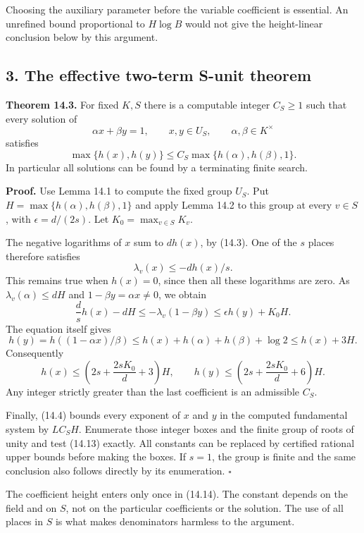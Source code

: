 \documentclass[
  11pt,
  a4paper,
]{article}
\begin{document}
Choosing the auxiliary parameter before the variable coefficient is
essential. An unrefined bound proportional to \(H\log B\) would not give
the height-linear conclusion below by this argument.

\subsection{3. The effective two-term S-unit
theorem}\label{the-effective-two-term-s-unit-theorem}

\textbf{Theorem 14.3.} For fixed \(K,S\) there is a computable integer
\(C_S\ge1\) such that every solution of \[
\alpha x+\beta y=1,\qquad x,y\in U_S,\qquad
\alpha,\beta\in K^\times
\tag{14.13}
\] satisfies \[
\max\{h(x),h(y)\}\le
C_S\max\{h(\alpha),h(\beta),1\}.
\tag{14.14}
\] In particular all solutions can be found by a terminating finite
search.

\textbf{Proof.} Use Lemma 14.1 to compute the fixed group \(U_S\). Put
\(H=\max\{h(\alpha),h(\beta),1\}\) and apply Lemma 14.2 to this group at
every \(v\in S\), with \(\epsilon=d/(2s)\). Let
\(K_0=\max_{v\in S}K_v\).

The negative logarithms of \(x\) sum to \(dh(x)\), by (14.3). One of the
\(s\) places therefore satisfies \[
\lambda_v(x)\le-dh(x)/s.
\tag{14.15}
\] This remains true when \(h(x)=0\), since then all these logarithms
are zero. As \(\lambda_v(\alpha)\le dH\) and \(1-\beta y=\alpha x\ne0\),
we obtain \[
\frac d s h(x)-dH
 \le-\lambda_v(1-\beta y)
 \le\epsilon h(y)+K_0H.
\tag{14.16}
\] The equation itself gives \[
h(y)=h((1-\alpha x)/\beta)
 \le h(x)+h(\alpha)+h(\beta)+\log2
 \le h(x)+3H.
\tag{14.17}
\] Consequently \[
h(x)\le
\left(2s+\frac{2sK_0}{d}+3\right)H,\qquad
h(y)\le
\left(2s+\frac{2sK_0}{d}+6\right)H.
\tag{14.18}
\] Any integer strictly greater than the last coefficient is an
admissible \(C_S\).

Finally, (14.4) bounds every exponent of \(x\) and \(y\) in the computed
fundamental system by \(LC_SH\). Enumerate those integer boxes and the
finite group of roots of unity and test (14.13) exactly. All constants
can be replaced by certified rational upper bounds before making the
boxes. If \(s=1\), the group is finite and the same conclusion also
follows directly by its enumeration. \(\square\)

The coefficient height enters only once in (14.14). The constant depends
on the field and on \(S\), not on the particular coefficients or the
solution. The use of all places in \(S\) is what makes denominators
harmless to the argument.
\end{document}
